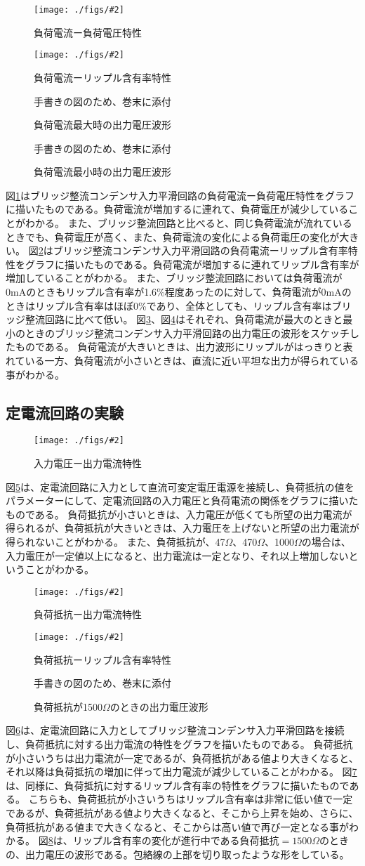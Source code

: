 \documentclass[11pt]{jsarticle}
\newcommand{\fg}[3]{ %
    \begin{figure}
        \begin{center}
            \texttt{[image: ./figs/\#2]}
            \caption{#3}
            \label{#1}
        \end{center}
    \end{figure}
}
\newcommand{\dummyfig}[2]{
    \begin{figure}
        \begin{center}
            \begin{shadebox}
                手書きの図のため、巻末に添付
            \end{shadebox}
            \caption{#2}
            \label{#1}
        \end{center}
    \end{figure}
}
\newcommand{\fr}[1]{図\ref{#1}}
\begin{document}
\fg{fig10}{{2.voltage}.png}{負荷電流ー負荷電圧特性}
\fg{fig11}{{2.ripple}.png}{負荷電流ーリップル含有率特性}
\dummyfig{fig12}{負荷電流最大時の出力電圧波形}
\dummyfig{fig13}{負荷電流最小時の出力電圧波形}

\fr{fig10}はブリッジ整流コンデンサ入力平滑回路の負荷電流ー負荷電圧特性をグラフに描いたものである。負荷電流が増加するに連れて、負荷電圧が減少していることがわかる。
また、ブリッジ整流回路と比べると、同じ負荷電流が流れているときでも、負荷電圧が高く、また、負荷電流の変化による負荷電圧の変化が大きい。
\fr{fig11}はブリッジ整流コンデンサ入力平滑回路の負荷電流ーリップル含有率特性をグラフに描いたものである。負荷電流が増加するに連れてリップル含有率が増加していることがわかる。
また、ブリッジ整流回路においては負荷電流が0mAのときもリップル含有率が1.6\%程度あったのに対して、負荷電流が0mAのときはリップル含有率はほぼ0\%であり、全体としても、リップル含有率はブリッジ整流回路に比べて低い。
\fr{fig12}、\fr{fig13}はそれぞれ、負荷電流が最大のときと最小のときのブリッジ整流コンデンサ入力平滑回路の出力電圧の波形をスケッチしたものである。
負荷電流が大きいときは、出力波形にリップルがはっきりと表れている一方、負荷電流が小さいときは、直流に近い平坦な出力が得られている事がわかる。

\subsection{定電流回路の実験}
\fg{fig14}{{3.voltage}.png}{入力電圧ー出力電流特性}
\fr{fig14}は、定電流回路に入力として直流可変定電圧電源を接続し、負荷抵抗の値をパラメーターにして、定電流回路の入力電圧と負荷電流の関係をグラフに描いたものである。
負荷抵抗が小さいときは、入力電圧が低くても所望の出力電流が得られるが、負荷抵抗が大きいときは、入力電圧を上げないと所望の出力電流が得られないことがわかる。
また、負荷抵抗が、47$\Omega$、470$\Omega$、1000$\Omega$の場合は、入力電圧が一定値以上になると、出力電流は一定となり、それ以上増加しないということがわかる。

\fg{fig15}{{4.current}.png}{負荷抵抗ー出力電流特性}
\fg{fig16}{{4.ripple}.png}{負荷抵抗ーリップル含有率特性}
\dummyfig{fig17}{負荷抵抗が1500$\Omega$のときの出力電圧波形}
\fr{fig15}は、定電流回路に入力としてブリッジ整流コンデンサ入力平滑回路を接続し、負荷抵抗に対する出力電流の特性をグラフを描いたものである。
負荷抵抗が小さいうちは出力電流が一定であるが、負荷抵抗がある値より大きくなると、それ以降は負荷抵抗の増加に伴って出力電流が減少していることがわかる。
\fr{fig16}は、同様に、負荷抵抗に対するリップル含有率の特性をグラフに描いたものである。
こちらも、負荷抵抗が小さいうちはリップル含有率は非常に低い値で一定であるが、負荷抵抗がある値より大きくなると、そこから上昇を始め、さらに、負荷抵抗がある値まで大きくなると、そこからは高い値で再び一定となる事がわかる。
\fr{fig17}は、リップル含有率の変化が進行中である負荷抵抗$=1500\Omega$のときの、出力電圧の波形である。包絡線の上部を切り取ったような形をしている。
\end{document}
